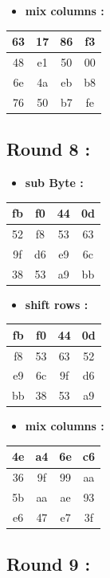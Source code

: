 \documentclass{article}
\begin{document}
\begin{itemize}
    \item \textbf{mix columns :}
\end{itemize} \begin{tabular}{|c|c|c|c|}
\hline 63 & 17 & 86 & f3 \\ \hline 48 & e1 & 50 & 00 \\ \hline 6e & 4a & eb & b8 \\ \hline 76 & 50 & b7 & fe \\ \hline \end{tabular}\hspace{0.5cm}\vspace{0.1cm}\subsection*{Round 8 : }\begin{itemize}
    \item \textbf{sub Byte :}
\end{itemize} \begin{tabular}{|c|c|c|c|}
\hline fb & f0 & 44 & 0d \\ \hline 52 & f8 & 53 & 63 \\ \hline 9f & d6 & e9 & 6c \\ \hline 38 & 53 & a9 & bb \\ \hline \end{tabular}\hspace{0.5cm}\vspace{0.1cm}\begin{itemize}
    \item \textbf{shift rows :}
\end{itemize} \begin{tabular}{|c|c|c|c|}
\hline fb & f0 & 44 & 0d \\ \hline f8 & 53 & 63 & 52 \\ \hline e9 & 6c & 9f & d6 \\ \hline bb & 38 & 53 & a9 \\ \hline \end{tabular}\hspace{0.5cm}\vspace{0.1cm}\begin{itemize}
    \item \textbf{mix columns :}
\end{itemize} \begin{tabular}{|c|c|c|c|}
\hline 4e & a4 & 6e & c6 \\ \hline 36 & 9f & 99 & aa \\ \hline 5b & aa & ae & 93 \\ \hline e6 & 47 & e7 & 3f \\ \hline \end{tabular}\hspace{0.5cm}\vspace{0.1cm}\subsection*{Round 9 : }\begin{itemize}

\end{itemize}
\end{document}
